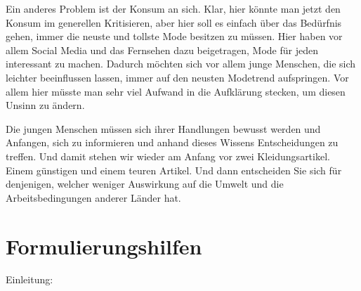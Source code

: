 Ein anderes Problem ist der Konsum an sich. Klar, hier könnte man jetzt den Konsum im generellen Kritisieren, aber hier soll es einfach über das Bedürfnis gehen, immer die neuste und tollste Mode besitzen zu müssen. Hier haben vor allem Social Media und das Fernsehen dazu beigetragen, Mode für jeden interessant zu machen. Dadurch möchten sich vor allem junge Menschen, die sich leichter beeinflussen lassen, immer auf den neusten Modetrend aufspringen. Vor allem hier müsste man sehr viel Aufwand in die Aufklärung stecken, um diesen Unsinn zu ändern.  

Die jungen Menschen müssen sich ihrer Handlungen bewusst werden und Anfangen, sich zu informieren und anhand dieses Wissens Entscheidungen zu treffen. Und damit stehen wir wieder am Anfang vor zwei Kleidungsartikel. Einem günstigen und einem teuren Artikel. Und dann entscheiden Sie sich für denjenigen, welcher weniger Auswirkung auf die Umwelt und die Arbeitsbedingungen anderer Länder hat. 
\newpage
\section{Formulierungshilfen}
Einleitung:

